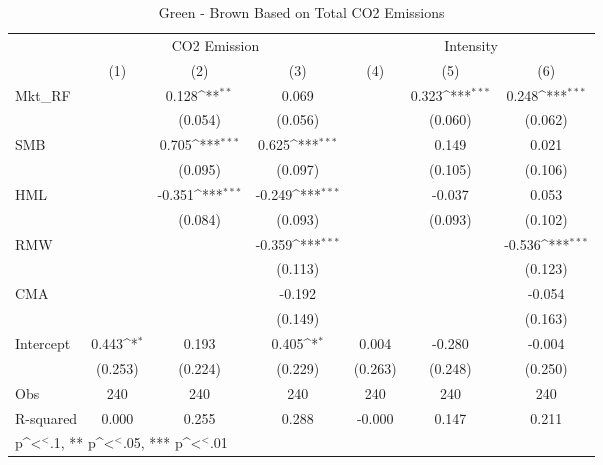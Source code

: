 \begin{table}[]
\caption{Green - Brown Based on Total CO2 Emissions}
\label{green-brown1}
{
\def\sym#1{\ifmmode^{#1}\else\(^{#1}\)\fi}
\begin{tabular}{@{\extracolsep{2pt}}l*{6}{c}@{}}
\hline\hline
& \multicolumn{3}{c}{CO2 Emission} & \multicolumn{3}{c}{Intensity} \\
\cline{2-4}
\cline{5-7}
 & (1) & (2) & (3) & (4) & (5) & (6) \\
\hline
Mkt\_RF &  & 0.128\sym{**} & 0.069 &  & 0.323\sym{***} & 0.248\sym{***} \\
 &  & (0.054) & (0.056) &  & (0.060) & (0.062) \\
SMB &  & 0.705\sym{***} & 0.625\sym{***} &  & 0.149 & 0.021 \\
 &  & (0.095) & (0.097) &  & (0.105) & (0.106) \\
HML &  & -0.351\sym{***} & -0.249\sym{***} &  & -0.037 & 0.053 \\
 &  & (0.084) & (0.093) &  & (0.093) & (0.102) \\
RMW &  &  & -0.359\sym{***} &  &  & -0.536\sym{***} \\
 &  &  & (0.113) &  &  & (0.123) \\
CMA &  &  & -0.192 &  &  & -0.054 \\
 &  &  & (0.149) &  &  & (0.163) \\
Intercept & 0.443\sym{*} & 0.193 & 0.405\sym{*} & 0.004 & -0.280 & -0.004 \\
 & (0.253) & (0.224) & (0.229) & (0.263) & (0.248) & (0.250) \\

\hline
Obs & 240 & 240 & 240 & 240 & 240 & 240 \\
R-squared & 0.000 & 0.255 & 0.288 & -0.000 & 0.147 & 0.211 \\
\hline\hline
\multicolumn{7}{l}{\footnotesize * p\sym{<}.1, ** p\sym{<}.05, *** p\sym{<}.01}
\end{tabular}
}
\end{table}